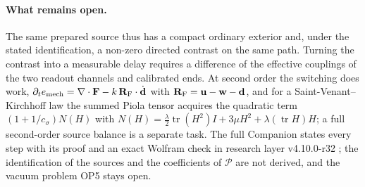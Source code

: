 \paragraph{What remains open.}
The same prepared source thus has a compact ordinary exterior and,
under the stated identification, a non-zero directed contrast on the
same path. Turning the contrast into a measurable delay requires a
difference of the effective couplings of the two readout channels and
calibrated ends. At second order the switching does work,
$\partial_te_{\rm mech}=\nabla\cdot\mathbf F-k\,\mathbf R_{\rm F}\cdot\dot{\mathbf d}$
with $\mathbf R_{\rm F}=\mathbf u-\mathbf w-\mathbf d$, and for a
Saint-Venant--Kirchhoff law the summed Piola tensor acquires the
quadratic term $(1+1/c_\sigma)N(H)$ with
$N(H)=\tfrac\lambda2\operatorname{tr}(H^2)I+3\mu H^2+\lambda(\operatorname{tr}H)H$;
a full second-order source balance is a separate task. The full
Companion states every step with its proof and an exact Wolfram check
in research layer v4.10.0-r32 \cite{QSC411}; the identification of the
sources and the coefficients of $\mathcal P$ are not derived, and the
vacuum problem OP5 stays open.
